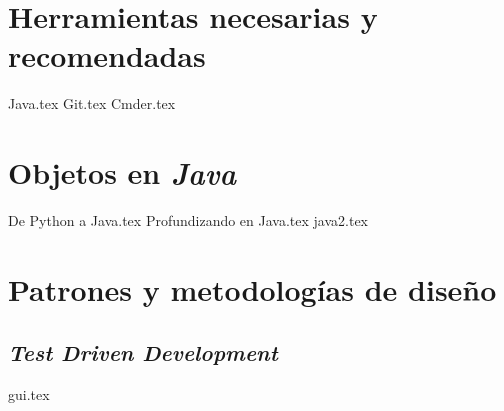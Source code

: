 \documentclass[12pt]{book}
\begin{document}
  \frontmatter
  \maketitle
  \tableofcontents
  

  \mainmatter
  \part{Herramientas necesarias y recomendadas}
    {Java.tex}
    {Git.tex}
    {Cmder.tex}
  \part{Objetos en \textit{Java}}
    
    {De Python a Java.tex}
    {Profundizando en Java.tex}
    {java2.tex}
  \part{Patrones y metodologías de diseño}
    \chapter{\textit{Test Driven Development}}
      \label{ch:tdd}
    {gui.tex}
\end{document}
